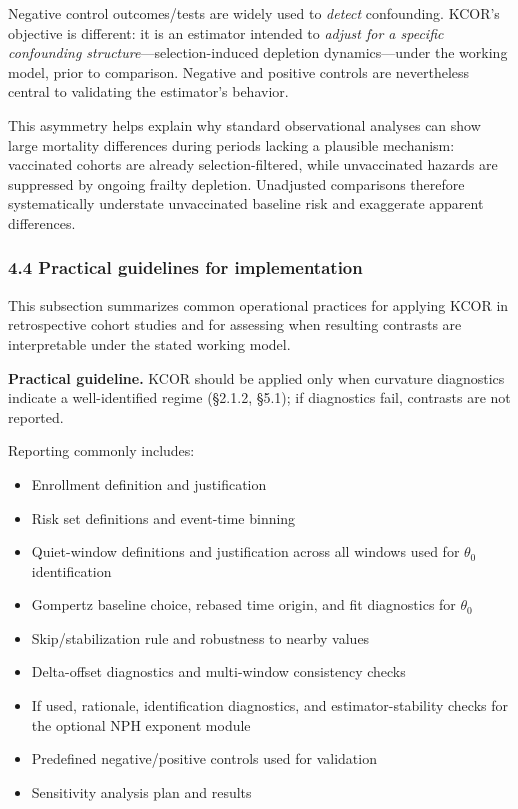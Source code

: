 \documentclass[
]{article}
\providecommand{\tightlist}{%
  \setlength{\itemsep}{0pt}\setlength{\parskip}{0pt}}
\begin{document}
Negative control outcomes/tests are widely used to \emph{detect}
confounding. KCOR's objective is different: it is an estimator intended
to \emph{adjust for a specific confounding
structure}---selection-induced depletion dynamics---under the working
model, prior to comparison. Negative and positive controls are
nevertheless central to validating the estimator's behavior.

This asymmetry helps explain why standard observational analyses can
show large mortality differences during periods lacking a plausible
mechanism: vaccinated cohorts are already selection-filtered, while
unvaccinated hazards are suppressed by ongoing frailty depletion.
Unadjusted comparisons therefore systematically understate unvaccinated
baseline risk and exaggerate apparent differences.

\subsubsection{4.4 Practical guidelines for
implementation}\label{practical-guidelines-for-implementation}

This subsection summarizes common operational practices for applying
KCOR in retrospective cohort studies and for assessing when resulting
contrasts are interpretable under the stated working model.

\textbf{Practical guideline.} KCOR should be applied only when curvature
diagnostics indicate a well-identified regime (§2.1.2, §5.1); if
diagnostics fail, contrasts are not reported.

Reporting commonly includes:

\begin{itemize}
\tightlist
\item
  Enrollment definition and justification
\item
  Risk set definitions and event-time binning
\item
  Quiet-window definitions and justification across all windows used for
  \(\theta_0\) identification
\item
  Gompertz baseline choice, rebased time origin, and fit diagnostics for
  \(\theta_0\)
\item
  Skip/stabilization rule and robustness to nearby values
\item
  Delta-offset diagnostics and multi-window consistency checks
\item
  If used, rationale, identification diagnostics, and
  estimator-stability checks for the optional NPH exponent module
\item
  Predefined negative/positive controls used for validation
\item
  Sensitivity analysis plan and results
\end{itemize}
\end{document}
